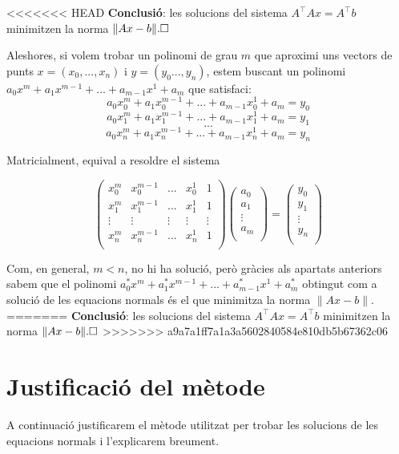 \documentclass{article}
\begin{document}
<<<<<<< HEAD
\textbf{Conclusió}: les solucions del sistema $  A^\top Ax= A^\top b $ minimitzen la norma $ \| Ax - b \|. \hfill \square$ \newline

Aleshores, si volem trobar un polinomi de grau $m$ que aproximi  uns vectors de punts $ x = \left(x_0,...,x_n\right) $ i $y = \left(y_0...,y_n\right)$, estem buscant un polinomi $a_0x^m+a_1x^{m-1}+...+a_{m-1}x^1+a_{m}$ que satisfaci:
$$ a_0x_{0}^{m}+a_1x_{0}^{m-1}+...+a_{m-1}x_{0}^1+a_{m} = y_0 $$
$$ a_0x_{1}^{m}+a_1x_{1}^{m-1}+...+a_{m-1}x_{1}^1+a_{m} = y_1 $$
$$...$$
$$ a_0x_{n}^{m}+a_1x_{n}^{m-1}+...+a_{m-1}x_{n}^1+a_{m} = y_n $$

Matricialment, equival a resoldre el sistema

$$
\label{def:matriu:A}
\left(
\begin{array}{ccccccc}
x_{0}^{m}   &  x_{0}^{m-1}  &   \dots    & x_{0}^1        &    1 \\
x_{1}^{m}   &  x_{1}^{m-1}  &   \dots    & x_{1}^1        &    1 \\
 \vdots  &  \vdots  &  \vdots   &     \vdots    &     \vdots \\
x_{n}^{m}   &  x_{n}^{m-1}  &   \dots    & x_{n}^1        &    1 \\
\end{array}
\right)
\left(
\begin{array}{ccccccc}
a_{0} \\
a_{1} \\
 \vdots \\
a_{m}  \\
\end{array}
\right)=
\left(
\begin{array}{ccccccc}
y_{0} \\
y_{1} \\
 \vdots \\
y_{n}  \\
\end{array}
\right)
$$

Com, en general, $m < n$, no hi ha solució, però gràcies als apartats anteriors sabem que el polinomi $a_0^*x^m+a_1^*x^{m-1}+...+a_{m-1}^*x^1+a_{m}^*$ obtingut com a solució de les equacions normals és el que minimitza la norma $ \| Ax - b \|$.
=======
\textbf{Conclusió}: les solucions del sistema $  A^\top Ax= A^\top b $ minimitzen la norma $ \| Ax - b \|. \hfill \square$
>>>>>>> a9a7a1ff7a1a3a5602840584e810db5b67362c06

\section{Justificació del mètode}
A continuació justificarem el mètode utilitzat per trobar les solucions de les equacions normals i l'explicarem breument.
\end{document}
